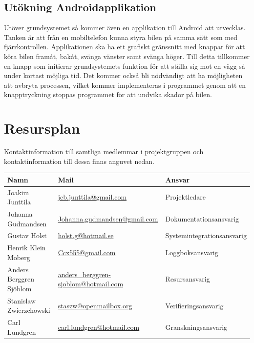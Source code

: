 \documentclass[a4paper]{article}
\begin{document}
\subsection{Utökning Androidapplikation}
Utöver grundsystemet så kommer även en applikation till Android att utvecklas. Tanken är att från en mobiltelefon kunna styra bilen på samma sätt som med fjärrkontrollen. Applikationen ska ha ett grafiskt gränssnitt med knappar för att köra bilen framåt, bakåt, svänga vänster samt svänga höger. Till detta tillkommer en knapp som initierar grundsystemets funktion för att ställa sig mot en vägg så under kortast möjliga tid. Det kommer också bli nödvändigt att ha möjligheten att avbryta processen, vilket kommer implementeras i programmet genom att en knapptryckning stoppas programmet för att undvika skador på bilen.

\section{Resursplan}
Kontaktinformation till samtliga medlemmar i projektgruppen och kontaktinformation till dessa finns anguvet nedan.
\vspace{5mm}

\begin{tabular}{|l|l|l|}  \hline
 \bf Namn                & \bf Mail                                  & \bf Ansvar                 \\ \hline \hline
 Joakim Junttila         & \url{jcb.​junttila@gmail.​com}              & Projektledare              \\ \hline
 Johanna Gudmandsen      & \url{Johanna.gudmandsen@gmail.com}        & Dokumentationsansvarig     \\ \hline
 Gustav Holst            & \url{holst.g@hotmail.se}                  & Systemintegrationsansvarig \\ \hline
 Henrik Klein Moberg     & \url{Ccx555@gmail.com}                    & Loggboksansvarig           \\ \hline
 Anders Berggren Sjöblom & \url{anders_berggren-sjoblom@hotmail.com} & Resursansvarig             \\ \hline
 Stanislaw Zwierzchowski & \url{staszw@openmailbox.org}              & Verifieringsansvarig       \\ \hline
 Carl Lundgren           & \url{carl.lundgren@hotmail.com}           & Granskningsansvarig        \\ \hline
\end{tabular}
\end{document}
